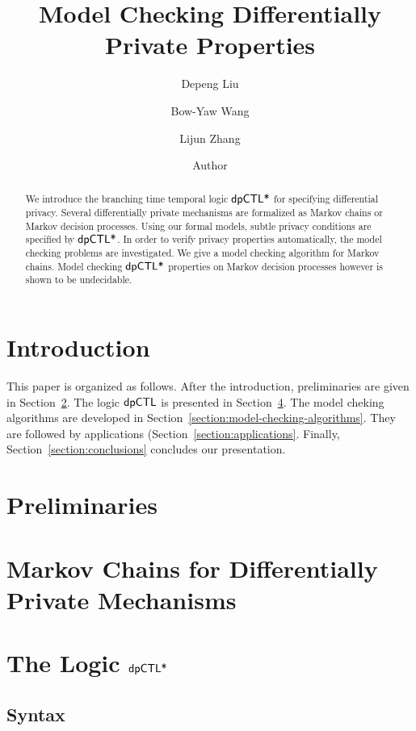 \documentclass{llncs}
\title{Model Checking Differentially Private Properties}
\author{
Depeng Liu\inst{1}
\and
Bow-Yaw Wang\inst{2}
\and
Lijun Zhang\inst{1}}
\institute{
Chinese Academy of Sciences
\and
Academia Sinica
}
\author{Author}
\institute{Institute}
\begin{document}
\maketitle

\begin{abstract}
  We introduce the branching time temporal logic $\textsf{dpCTL*}$ for
  specifying differential privacy. Several differentially private
  mechanisms are formalized as Markov chains or Markov decision
  processes. Using our formal models, subtle privacy conditions
  are specified by $\textsf{dpCTL*}$. In order to verify privacy properties
  automatically, the model checking problems are investigated.  We
  give a model checking algorithm for Markov chains. Model checking
  $\textsf{dpCTL*}$ properties on Markov decision processes however is
  shown to be undecidable.
\end{abstract}

\section{Introduction}
\label{section:introduction}


This paper is organized as follows. After the introduction,
preliminaries are given in Section~\ref{section:preliminaries}. The
logic $\textsf{dpCTL}$ is presented in
Section~\ref{section:dpCTL}. The model cheking algorithms are developed in
Section~\ref{section:model-checking-algorithms}. They are followed by
applications (Section~\ref{section:applications}. Finally,
Section~\ref{section:conclusions} concludes our presentation.

\section{Preliminaries}
\label{section:preliminaries}


\section{Markov Chains  for Differentially Private Mechanisms}
\label{section:examples}


\section{The Logic $\textsf{dpCTL*}$}
\label{section:dpCTL}


\subsection{Syntax}
\label{subsection:syntax}

\end{document}
